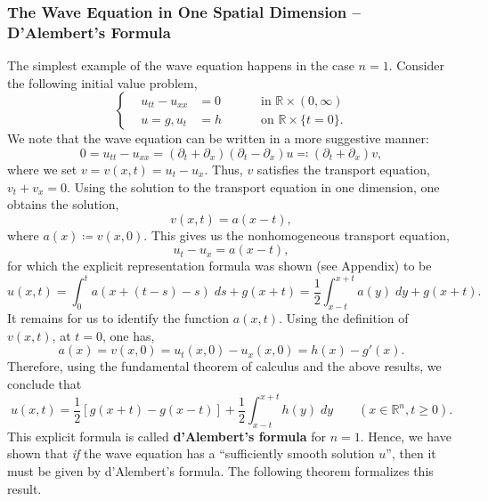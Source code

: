 \documentclass{article}
\numberwithin{equation}{section}
\begin{document}
	\subsubsection{The Wave Equation in One Spatial Dimension -- D'Alembert's Formula}
	The simplest example of the wave equation happens in the case $n = 1$. Consider the following initial value problem, 
	\begin{equation}
		\left\{
		\begin{alignedat}{3}
			&u_{tt} - u_{xx} &= 0 &\qquad \text{ in $\mathbb{R} \times (0, \infty)$}  \\
			&u = g,  u_{t} &= h &\qquad \text{ on $\mathbb{R} \times \{t = 0\}$}. 
		\end{alignedat}
		\right.
	\end{equation}
	We note that the wave equation can be written in a more suggestive manner: 
	\begin{equation}
		0 = u_{tt} - u_{xx} = (\partial_{t} + \partial_{x})(\partial_{t} - \partial_{x})u \eqqcolon (\partial_{t} + \partial_{x})v, 
	\end{equation}
	where we set $v = v(x, t) = u_{t} - u_{x}$. Thus, $v$ satisfies the transport equation, $v_{t} + v_{x} = 0$. Using the solution to the transport equation in one dimension, one obtains the solution, 
	\begin{equation*}
		v(x, t) = a(x - t), 
	\end{equation*}
	where $a(x) \coloneqq v(x, 0)$. This gives us the nonhomogeneous transport equation, 
	\begin{equation*}
		u_{t} -u_{x} = a(x -t), 
	\end{equation*}
	for which the explicit representation formula was shown (see Appendix) to be 
	\begin{equation}
		u(x, t) = \int_{0}^{t}a(x + (t - s)- s)\;ds + g(x + t) = \frac{1}{2}\int_{x - t}^{x + t}a(y)\;dy + g(x + t). 
	\end{equation}
	It remains for us to identify the function $a(x, t)$. Using the definition of $v(x, t)$, at $t = 0$, one has, 
	\begin{equation*}
		a(x) = v(x,0) = u_{t}(x, 0) - u_{x}(x, 0) = h(x) - g'(x). 
	\end{equation*}
	Therefore, using the fundamental theorem of calculus and the above results, we conclude that 
	\begin{equation}
		\boxed{u(x, t) = \frac{1}{2}\left[g(x + t) - g(x - t)\right] + \frac{1}{2}\int_{x - t}^{x + t}h(y)\;dy} \qquad (x \in \mathbb{R}^{n}, t \geq 0). 
	\end{equation}
	This explicit formula is called \textbf{d'Alembert's formula} for $n = 1$. Hence, we have shown that \textit{if} the wave equation has a ``sufficiently smooth solution $u$'', then it must be given by d'Alembert's formula. The following theorem formalizes this result. 
	
\end{document}
